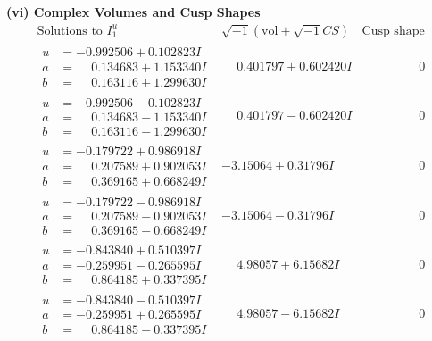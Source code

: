 \documentclass[1p]{elsarticle_modified}
\theoremstyle{definition}
\newcommand{\I}{\sqrt{-1}}
\begin{document}
\newpage\flushleft \textbf{(vi) Complex Volumes and Cusp Shapes}
$$\begin{array}{c|c|c}  
\text{Solutions to }I^u_{1}& \I (\text{vol} + \sqrt{-1}CS) & \text{Cusp shape}\\
 \hline 
\begin{aligned}
u &= -0.992506 + 0.102823 I \\
a &= \phantom{-}0.134683 + 1.153340 I \\
b &= \phantom{-}0.163116 + 1.299630 I\end{aligned}
 & \phantom{-}0.401797 + 0.602420 I & \phantom{-0.000000 } 0 \\ \hline\begin{aligned}
u &= -0.992506 - 0.102823 I \\
a &= \phantom{-}0.134683 - 1.153340 I \\
b &= \phantom{-}0.163116 - 1.299630 I\end{aligned}
 & \phantom{-}0.401797 - 0.602420 I & \phantom{-0.000000 } 0 \\ \hline\begin{aligned}
u &= -0.179722 + 0.986918 I \\
a &= \phantom{-}0.207589 + 0.902053 I \\
b &= \phantom{-}0.369165 + 0.668249 I\end{aligned}
 & -3.15064 + 0.31796 I & \phantom{-0.000000 } 0 \\ \hline\begin{aligned}
u &= -0.179722 - 0.986918 I \\
a &= \phantom{-}0.207589 - 0.902053 I \\
b &= \phantom{-}0.369165 - 0.668249 I\end{aligned}
 & -3.15064 - 0.31796 I & \phantom{-0.000000 } 0 \\ \hline\begin{aligned}
u &= -0.843840 + 0.510397 I \\
a &= -0.259951 - 0.265595 I \\
b &= \phantom{-}0.864185 + 0.337395 I\end{aligned}
 & \phantom{-}4.98057 + 6.15682 I & \phantom{-0.000000 } 0 \\ \hline\begin{aligned}
u &= -0.843840 - 0.510397 I \\
a &= -0.259951 + 0.265595 I \\
b &= \phantom{-}0.864185 - 0.337395 I\end{aligned}
 & \phantom{-}4.98057 - 6.15682 I & \phantom{-0.000000 } 0 \\ \hline\begin{aligned}

\end{aligned}
\end{array}$$
\end{document}
